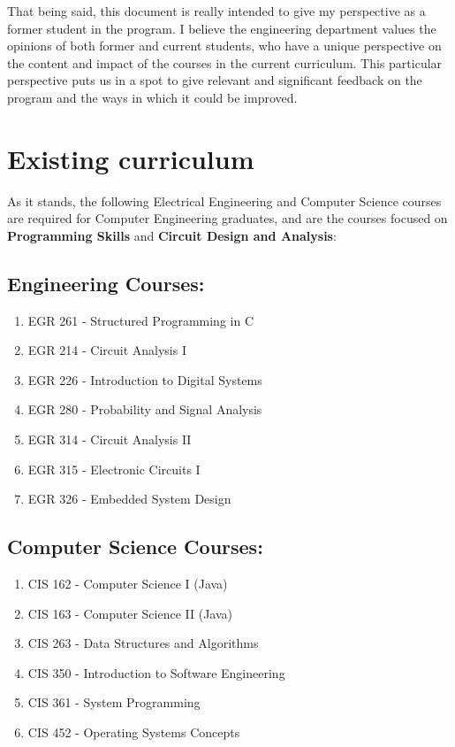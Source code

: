 \documentclass[12pt]{article}
\numberwithin{figure}{section}
\numberwithin{equation}{section}
\begin{document}
{\bigskip

That being said, this document is really intended to give my perspective
as a former student in the program. I believe the engineering department
values the opinions of both former and current students, who have a
unique perspective on the content and impact of the courses in the
current curriculum. This particular perspective puts us in a spot to
give relevant and significant feedback on the program and the ways in
which it could be improved.

\newpage
\section{Existing curriculum}\label{existing-curriculum}
As it stands, the following Electrical Engineering and Computer Science
courses are required for Computer Engineering graduates, and are the
courses focused on \textbf{Programming Skills} and \textbf{Circuit
Design and Analysis}:

\subsection{Engineering Courses:}\label{engineering-courses}
\begin{enumerate}
\itemsep1pt\parskip0pt
\item EGR 261 - Structured Programming in C
\item EGR 214 - Circuit Analysis I
\item EGR 226 - Introduction to Digital Systems
\item EGR 280 - Probability and Signal Analysis
\item EGR 314 - Circuit Analysis II
\item EGR 315 - Electronic Circuits I
\item EGR 326 - Embedded System Design
\end{enumerate}

\subsection{Computer Science Courses:}\label{computer-science-courses}
\begin{enumerate}
\itemsep1pt\parskip0pt
\item CIS 162 - Computer Science I (Java)
\item CIS 163 - Computer Science II (Java)
\item CIS 263 - Data Structures and Algorithms
\item CIS 350 - Introduction to Software Engineering
\item CIS 361 - System Programming
\item CIS 452 - Operating Systems Concepts
\end{enumerate}

}
\end{document}
